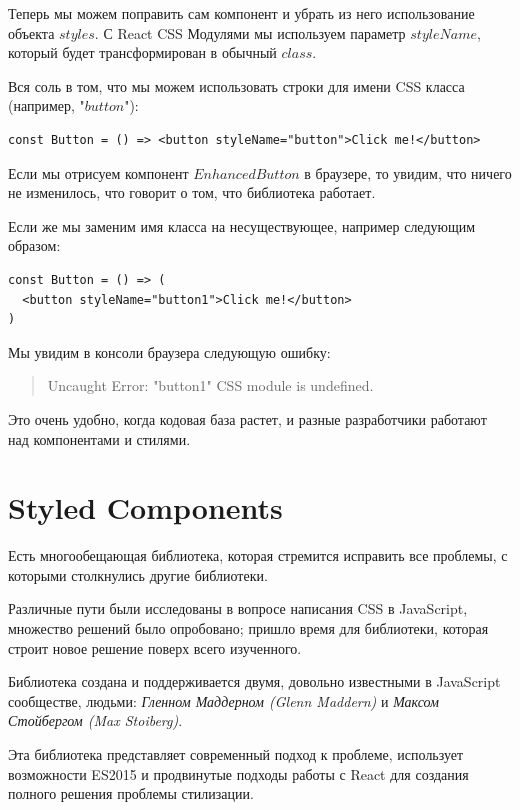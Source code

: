 Теперь мы можем поправить сам компонент и убрать из него использование объекта $styles$. С React CSS Модулями мы используем параметр $styleName$, который будет трансформирован в обычный $class$.

Вся соль в том, что мы можем использовать строки для имени CSS класса (например, "$button$"):

\begin{lstlisting}
const Button = () => <button styleName="button">Click me!</button>
\end{lstlisting}

Если мы отрисуем компонент $EnhancedButton$ в браузере, то увидим, что ничего не изменилось, что говорит о том, что библиотека работает.

Если же мы заменим имя класса на несуществующее, например следующим образом:

\begin{lstlisting}
const Button = () => (
  <button styleName="button1">Click me!</button>
)
\end{lstlisting}

Мы увидим в консоли браузера следующую ошибку:

\begin{quotation}
Uncaught Error: "button1" CSS module is undefined.
\end{quotation}

Это очень удобно, когда кодовая база растет, и разные разработчики работают над компонентами и стилями.

\section{Styled Components}

Есть многообещающая библиотека, которая стремится исправить все проблемы, с которыми столкнулись другие библиотеки.

Различные пути были исследованы в вопросе написания CSS в JavaScript, множество решений было опробовано; пришло время для библиотеки, которая строит новое решение поверх всего изученного.

Библиотека создана и поддерживается двумя, довольно известными в JavaScript сообществе, людьми: \textit{Гленном Маддерном (Glenn Maddern)} и \textit{Максом Стойбергом (Max Stoiberg)}.

Эта библиотека представляет современный подход к проблеме, использует возможности ES2015 и продвинутые подходы работы с React для создания полного решения проблемы стилизации.

